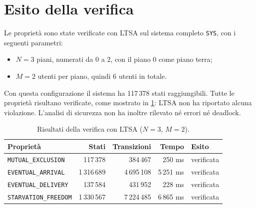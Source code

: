 \section{Esito della verifica}
Le proprietà sono state verificate con LTSA sul sistema completo \texttt{SYS}, con i seguenti parametri:
\begin{itemize}
  \item $N = 3$ piani, numerati da 0 a 2, con il piano 0 come piano terra;
  \item $M = 2$ utenti per piano, quindi 6 utenti in totale.
\end{itemize}

Con questa configurazione il sistema ha 117\,378 stati raggiungibili.
Tutte le proprietà risultano verificate, come mostrato in \cref{tab:risultati_ltsa}: LTSA non ha riportato alcuna violazione.
L'analisi di sicurezza non ha inoltre rilevato né errori né deadlock.

\begin{table}[H]
  \centering
  \begin{tabular}{lrrrl}
    \toprule
    Proprietà & Stati & Transizioni & Tempo & Esito \\
    \midrule
    \texttt{MUTUAL\_EXCLUSION}   & 117\,378   & 384\,467   & 250 ms
    & verificata \\
    \texttt{EVENTUAL\_ARRIVAL}   & 1\,316\,689 & 4\,695\,108 & 5\,251
    ms & verificata \\
    \texttt{EVENTUAL\_DELIVERY}  & 137\,584   & 431\,952   & 228 ms
    & verificata \\
    \texttt{STARVATION\_FREEDOM} & 1\,330\,567 & 7\,224\,485 & 6\,865
    ms & verificata \\
    \bottomrule
  \end{tabular}
  \caption{Risultati della verifica con LTSA ($N = 3$, $M = 2$).}
  \label{tab:risultati_ltsa}
\end{table}
